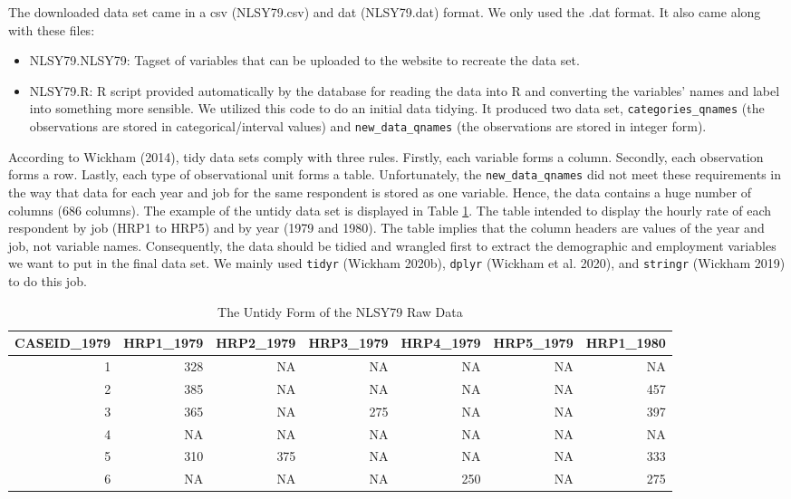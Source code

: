 \documentclass{article}
\begin{document}
The downloaded data set came in a csv (NLSY79.csv) and dat (NLSY79.dat) format. We only used the .dat format. It also came along with these files:

\begin{itemize}
\tightlist
\item
  NLSY79.NLSY79: Tagset of variables that can be uploaded to the website to recreate the data set.
\item
  NLSY79.R: R script provided automatically by the database for reading the data into R and converting the variables' names and label into something more sensible. We utilized this code to do an initial data tidying. It produced two data set, \texttt{categories\_qnames} (the observations are stored in categorical/interval values) and \texttt{new\_data\_qnames} (the observations are stored in integer form).
\end{itemize}

According to Wickham (2014), tidy data sets comply with three rules. Firstly, each variable forms a column. Secondly, each observation forms a row. Lastly, each type of observational unit forms a table. Unfortunately, the \texttt{new\_data\_qnames} did not meet these requirements in the way that data for each year and job for the same respondent is stored as one variable. Hence, the data contains a huge number of columns (686 columns). The example of the untidy data set is displayed in Table \ref{tab:untidy-data}. The table intended to display the hourly rate of each respondent by job (HRP1 to HRP5) and by year (1979 and 1980). The table implies that the column headers are values of the year and job, not variable names. Consequently, the data should be tidied and wrangled first to extract the demographic and employment variables we want to put in the final data set. We mainly used \texttt{tidyr} (Wickham 2020b), \texttt{dplyr} (Wickham et al. 2020), and \texttt{stringr} (Wickham 2019) to do this job.

\begin{table}

\caption{\label{tab:untidy-data}The Untidy Form of the NLSY79 Raw Data}
\centering
\begin{tabular}[t]{r|r|r|r|r|r|r}
\hline
CASEID\_1979 & HRP1\_1979 & HRP2\_1979 & HRP3\_1979 & HRP4\_1979 & HRP5\_1979 & HRP1\_1980\\
\hline
1 & 328 & NA & NA & NA & NA & NA\\
\hline
2 & 385 & NA & NA & NA & NA & 457\\
\hline
3 & 365 & NA & 275 & NA & NA & 397\\
\hline
4 & NA & NA & NA & NA & NA & NA\\
\hline
5 & 310 & 375 & NA & NA & NA & 333\\
\hline
6 & NA & NA & NA & 250 & NA & 275\\
\hline
\end{tabular}
\end{table}
\end{document}
